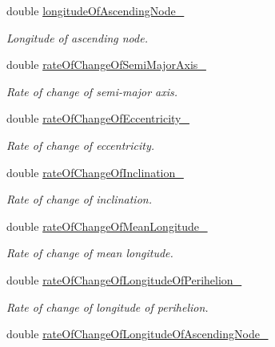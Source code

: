 \begin{DoxyCompactItemize}
double \hyperlink{structtudat_1_1ephemerides_1_1ApproximatePlanetPositionsDataContainer_acdc92f2358fb6d9ebbedbd6f694c3bc1}{longitude\+Of\+Ascending\+Node\+\_\+}
\begin{DoxyCompactList}\small\item\em Longitude of ascending node. \end{DoxyCompactList}\item 
double \hyperlink{structtudat_1_1ephemerides_1_1ApproximatePlanetPositionsDataContainer_a1c8272dc9e033bf670258943b159bfed}{rate\+Of\+Change\+Of\+Semi\+Major\+Axis\+\_\+}
\begin{DoxyCompactList}\small\item\em Rate of change of semi-\/major axis. \end{DoxyCompactList}\item 
double \hyperlink{structtudat_1_1ephemerides_1_1ApproximatePlanetPositionsDataContainer_ad791c01b09d1abc2195ebc421bcb5430}{rate\+Of\+Change\+Of\+Eccentricity\+\_\+}
\begin{DoxyCompactList}\small\item\em Rate of change of eccentricity. \end{DoxyCompactList}\item 
double \hyperlink{structtudat_1_1ephemerides_1_1ApproximatePlanetPositionsDataContainer_addace5b4d9c07f45bf7b468734a3d624}{rate\+Of\+Change\+Of\+Inclination\+\_\+}
\begin{DoxyCompactList}\small\item\em Rate of change of inclination. \end{DoxyCompactList}\item 
double \hyperlink{structtudat_1_1ephemerides_1_1ApproximatePlanetPositionsDataContainer_ac7ea2134ba05e1025d387e637a2fc72b}{rate\+Of\+Change\+Of\+Mean\+Longitude\+\_\+}
\begin{DoxyCompactList}\small\item\em Rate of change of mean longitude. \end{DoxyCompactList}\item 
double \hyperlink{structtudat_1_1ephemerides_1_1ApproximatePlanetPositionsDataContainer_a9cc926b0ec785d207bf3dc9b9ac011bd}{rate\+Of\+Change\+Of\+Longitude\+Of\+Perihelion\+\_\+}
\begin{DoxyCompactList}\small\item\em Rate of change of longitude of perihelion. \end{DoxyCompactList}\item 
double \hyperlink{structtudat_1_1ephemerides_1_1ApproximatePlanetPositionsDataContainer_a6ff272075cdadb6cbe5268ace4cfb79b}{rate\+Of\+Change\+Of\+Longitude\+Of\+Ascending\+Node\+\_\+}

\end{DoxyCompactItemize}
